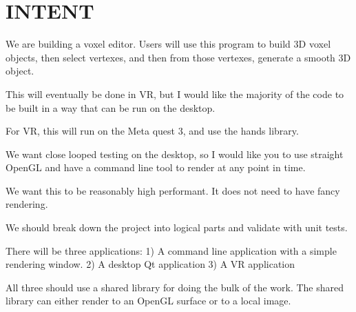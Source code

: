 \chapter{INTENT }
\label{md__i_n_t_e_n_t}
We are building a voxel editor. Users will use this program to build 3D voxel objects, then select vertexes, and then from those vertexes, generate a smooth 3D object.

This will eventually be done in VR, but I would like the majority of the code to be built in a way that can be run on the desktop.

For VR, this will run on the Meta quest 3, and use the hands library.

We want close looped testing on the desktop, so I would like you to use straight Open\+GL and have a command line tool to render at any point in time.

We want this to be reasonably high performant. It does not need to have fancy rendering.

We should break down the project into logical parts and validate with unit tests.

There will be three applications\+: 1) A command line application with a simple rendering window. 2) A desktop Qt application 3) A VR application

All three should use a shared library for doing the bulk of the work. The shared library can either render to an Open\+GL surface or to a local image. 